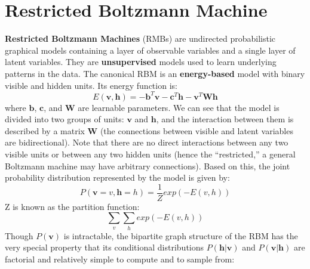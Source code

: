 \section{Restricted Boltzmann Machine}
\textbf{Restricted Boltzmann Machines} (RMBs) are undirected probabilistic graphical models containing a layer of observable variables and a single layer of latent variables. They are \textbf{unsupervised} models used to learn underlying patterns in the data.\newline\newline
The canonical RBM is an \textbf{energy-based} model with binary visible and hidden units. Its energy function is:
\[E(\textbf{v}, \textbf{h}) = -\textbf{b}^T \textbf{v} - \textbf{c}^T \textbf{h} - \textbf{v}^T \textbf{W} \textbf{h}\]
where $\textbf{b}$, $\textbf{c}$, and $\textbf{W}$ are learnable parameters. We can see that the model is divided into two groups of units: $\textbf{v}$ and $\textbf{h}$, and the interaction between them is described by a matrix $\textbf{W}$ (the connections between visible and latent variables are bidirectional). Note that there are no direct interactions between any two visible units or between any two hidden units (hence the “restricted,” a general Boltzmann machine may have arbitrary connections).\newline\newline
Based on this, the joint probability distribution represented by the model is given by:
\[P(\textbf{v} = v, \textbf{h} = h) = \frac{1}{Z}exp(-E(v, h))\]
Z is known as the partition function:
\[\sum_v \sum_h exp(-E(v, h))\]
Though $P(\textbf{v})$ is intractable, the bipartite graph structure of the RBM has the very special property that its conditional distributions $P(\textbf{h} | \textbf{v})$ and $P(\textbf{v} | \textbf{h})$ are factorial and relatively simple to compute and to sample from:
